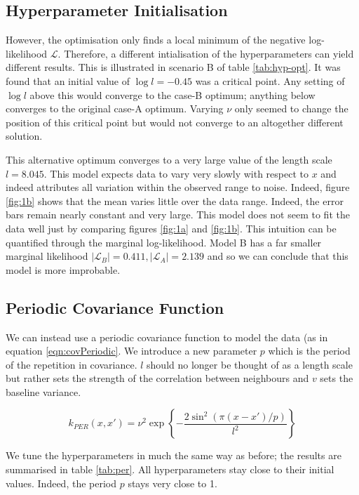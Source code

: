 \documentclass[]{article}
\newcommand{\Lcal}{\mathcal{L}}
\begin{document}
\subsection{Hyperparameter Initialisation}

However, the optimisation only finds a local minimum of the negative log-likelihood $\Lcal$. Therefore, a different intialisation of the hyperparameters can yield different results. This is illustrated in scenario B of table \ref{tab:hyp-opt}. It was found that an initial value of $\log l = -0.45$ was a critical point. Any setting of $\log l $ above this would converge to the case-B optimum; anything below converges to the original case-A optimum. Varying $\nu$ only seemed to change the position of this critical point but would not converge to an altogether different solution.

This alternative optimum converges to a very large value of the length scale $l=8.045$. This model expects data to vary very slowly with respect to $x$ and indeed attributes all variation within the observed range to noise. Indeed, figure \ref{fig:1b} shows that the mean varies little over the data range. Indeed, the error bars remain nearly constant and very large. This model does not seem to fit the data well just by comparing figures \ref{fig:1a} and \ref{fig:1b}. This intuition can be quantified through the marginal log-likelihood. Model B has a far smaller marginal likelihood $|\Lcal_B|=0.411, |\Lcal_A|=2.139$ and so we can conclude that this model is more improbable.


\subsection{Periodic Covariance Function}

We can instead use a periodic covariance function to model the data (as in equation \ref{eqn:covPeriodic}. We introduce a new parameter $p$ which is the period of the repetition in covariance. $l$ should no longer be thought of as a length scale but rather sets the strength of the correlation between neighbours and $v$ sets the baseline variance.

\begin{equation}
k_{PER}(x, x') = \nu^2 \exp
\left\{
- \frac{2 \sin ^2 \left( \pi (x-x') / p \right)}{l^2}
\right\}
\label{eqn:covPeriodic}
\end{equation}

We tune the hyperparameters in much the same way as before; the results are summarised in table \ref{tab:per}. All hyperparameters stay close to their initial values. Indeed, the period $p$ stays very close to 1.
\end{document}
